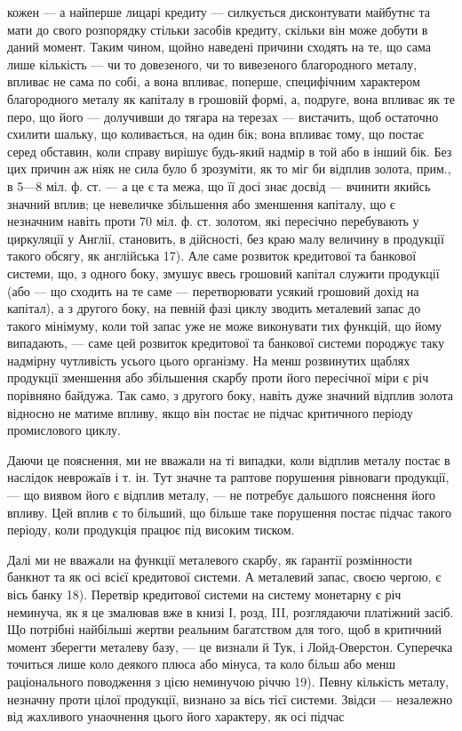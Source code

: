 кожен — а найперше лицарі кредиту — силкується дисконтувати майбутнє та
мати до свого розпорядку стільки засобів кредиту, скільки він може добути в
даний момент. Таким чином, щойно наведені причини сходять на те, що сама
лише кількість — чи то довезеного, чи то вивезеного благородного металу, впливає
не сама по собі, а вона впливає, поперше, специфічним характером благородного
металу як капіталу в грошовій формі, а, подруге, вона впливає як те перо,
що його — долучивши до тягара на терезах — вистачить, щоб остаточно схилити
шальку, що коливається, на один бік; вона впливає тому, що постає серед
обставин, коли справу вирішує будь-який надмір в той або в інший бік. Без цих
причин аж ніяк не сила було б зрозуміти, як то міг би відплив золота, прим.,
в 5—8 міл. ф. ст. — а це є та межа, що її досі знає досвід — вчинити якийсь
значний вплив; це невеличке збільшення або зменшення капіталу, що є незначним
навіть проти 70 міл. ф. ст. золотом, які пересічно перебувають у циркуляції
у Англії, становить, в дійсності, без краю малу величину в продукції такого
обсягу, як англійська 17). Але саме розвиток кредитової та банкової системи, що,
з одного боку, змушує ввесь грошовий капітал служити продукції (або — що
сходить на те саме — перетворювати усякий грошовий дохід на капітал), а з
другого боку, на певній фазі циклу зводить металевий запас до такого мінімуму,
коли той запас уже не може виконувати тих функцій, що йому випадають, —
саме цей розвиток кредитової та банкової системи породжує таку надмірну чутливість
усього цього організму. На менш розвинутих щаблях продукції зменшення
або збільшення скарбу проти його пересічної міри є річ порівняно байдужа.
Так само, з другого боку, навіть дуже значний відплив золота відносно
не матиме впливу, якщо він постає не підчас критичного періоду промислового
циклу.

Даючи це пояснення, ми не вважали на ті випадки, коли відплив металу
постає в наслідок неврожаїв і т. ін. Тут значне та раптове порушення рівноваги
продукції, — що виявом його є відплив металу, — не потребує дальшого пояснення
його впливу. Цей вплив є то більший, що більше таке порушення постає
підчас такого періоду, коли продукція працює під високим тиском.

Далі ми не вважали на функції металевого скарбу, як ґарантії розмінности
банкнот та як осі всієї кредитової системи. А металевий запас, своєю чергою,
є вісь банку 18). Перетвір кредитової системи на систему монетарну є річ неминуча,
як я це змалював вже в книзі І, розд, III, розглядаючи платіжний
засіб. Що потрібні найбільші жертви реальним багатством для того, щоб в критичний
момент зберегти металеву базу, — це визнали й Тук, і Лойд-Оверстон.
Суперечка точиться лише коло деякого плюса або мінуса, та коло більш або
менш раціонального поводження з цією неминучою річчю 19). Певну кількість
металу, незначну проти цілої продукції, визнано за вісь тієї системи. Звідси —
незалежно від жахливого унаочнення цього його характеру, як осі підчас

